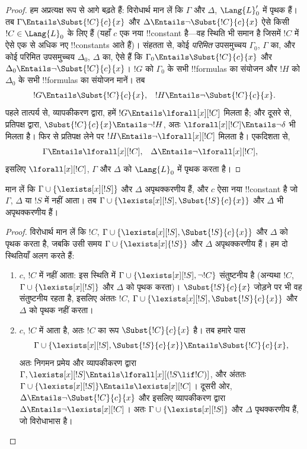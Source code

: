 \documentclass[../../../include/open-logic-section]{subfiles}
\begin{document}
\begin{proof}
हम अप्रत्यक्ष रूप से आगे बढ़ते हैं: विरोधार्थ मान लें कि $\Gamma$ और
$\Delta$, $\Lang{L}'_0$ में पृथक हैं। तब $\Gamma \Entails
\Subst{!C}{c}{x}$ और $\Delta \Entails \lnot \Subst{!C}{c}{x}$ ऐसे
किसी $!C \in
\Lang{L}_0$ के लिए हैं (यहाँ $c$ एक नया !!{constant} है---वह स्थिति भी
समान है जिसमें $!C$ में ऐसे एक से अधिक नए !!{constant}s आते हैं)।
संहतता से, कोई \emph{परिमित} उपसमुच्चय $\Gamma_0$, $\Gamma$ का, और कोई
परिमित उपसमुच्चय $\Delta_0$, $\Delta$ का, ऐसे हैं कि
$\Gamma_0 \Entails \Subst{!C}{c}{x}$ और $\Delta_0 \Entails \lnot \Subst{!C}{c}{x}$।
$!G$ को $\Gamma_0$ के सभी !!{formula}s का संयोजन और
$!H$ को $\Delta_0$ के सभी !!{formula}s का संयोजन मानें। तब
\begin{align*}
  {}!G & \Entails \Subst{!C}{c}{x}, & {}!H  \Entails \lnot \Subst{!C}{c}{x}.
\end{align*}
पहले तात्पर्य से, व्यापकीकरण द्वारा, हमें $!G \Entails
\lforall[x][!C]$ मिलता है; और दूसरे से, प्रतिपक्ष द्वारा,
$\Subst{!C}{c}{x} \Entails \lnot !H$, अतः $\lforall[x][!C]
\Entails \lnot \delta$ भी मिलता है। फिर से प्रतिपक्ष लेने पर $!H \Entails
\lnot \lforall[x][!C]$ मिलता है। एकदिशता से,
\begin{align*}
  \Gamma &\Entails \lforall[x][!C], & 
  \Delta & \Entails \lnot \lforall[x][!C],
\end{align*}
इसलिए $\lforall[x][!C]$, $\Gamma$ और $\Delta$ को $\Lang{L}_0$ में पृथक
करता है।
\end{proof}

\begin{lem}
मान लें कि $\Gamma \cup \{ \lexists[x][!S] \}$ और $\Delta$
अपृथक्करणीय हैं, और $c$ ऐसा नया !!{constant} है जो $\Gamma$, $\Delta$
या $!S$ में नहीं आता। तब $\Gamma \cup \{ \lexists[x][!S], \Subst{!S}{c}{x} \}$
और $\Delta$ भी अपृथक्करणीय हैं।
\end{lem}

\begin{proof}
विरोधार्थ मान लें कि $!C$, $\Gamma \cup \{
\lexists[x][!S], \Subst{!S}{c}{x}\}$ और $\Delta$ को पृथक करता है, जबकि उसी समय
$\Gamma \cup \{\lexists[x]{!S} \}$ और $\Delta$ अपृथक्करणीय हैं। हम
दो स्थितियाँ अलग करते हैं:
\begin{enumerate}
\item $c$, $!C$ में नहीं आता: इस स्थिति में $\Gamma \cup
  \{\lexists[x][!S], \lnot!C \}$ संतुष्टनीय है (अन्यथा $!C$,
  $\Gamma \cup \{\lexists[x][!S] \}$ और $\Delta$ को पृथक करता)।
  $\Subst{!S}{c}{x}$ जोड़ने पर भी वह संतुष्टनीय रहता है, इसलिए अंततः
  $!C$, $\Gamma \cup \{ \lexists[x][!S], \Subst{!S}{c}{x} \}$ और
  $\Delta$ को पृथक नहीं करता।
\item $c$, $!C$ में आता है, अतः $!C$ का रूप $\Subst{!C}{c}{x}$ है। तब
  हमारे पास
  \[
  \Gamma \cup \{ \lexists[x][!S], \Subst{!S}{c}{x}\} \Entails \Subst{!C}{c}{x},
  \]
  अतः निगमन प्रमेय और व्यापकीकरण द्वारा $\Gamma, \lexists[x][!S] \Entails \lforall[x][(!S \lif !C)]$,
  और अंततः $\Gamma
  \cup \{ \lexists[x][!S] \} \Entails \lexists[x][!C]$।
  दूसरी ओर, $\Delta \Entails \lnot \Subst{!C}{c}{x}$ और इसलिए
  व्यापकीकरण द्वारा $\Delta \Entails \lnot \lexists[x][!C]$। अतः
  $\Gamma
  \cup \{\lexists[x][!S] \}$ और $\Delta$ पृथक्करणीय हैं, जो
  विरोधाभास है।
\end{enumerate}
\end{proof}
\end{document}
